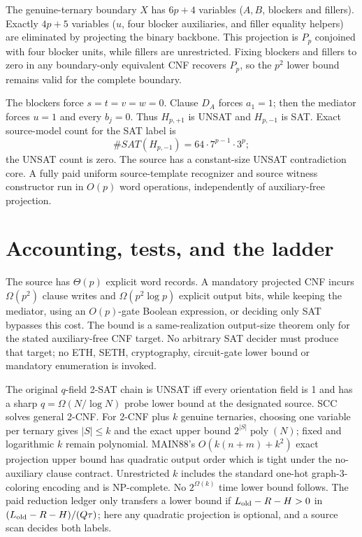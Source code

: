 \documentclass[11pt]{article}
\begin{document}
The genuine-ternary boundary $X$ has $6p+4$ variables ($A,B$, blockers and fillers). Exactly $4p+5$ variables ($u$, four blocker auxiliaries, and filler equality helpers) are eliminated by projecting the binary backbone. This projection is $P_p$ conjoined with four blocker units, while fillers are unrestricted. Fixing blockers and fillers to zero in any boundary-only equivalent CNF recovers $P_p$, so the $p^2$ lower bound remains valid for the complete boundary.

The blockers force $s=t=v=w=0$. Clause $D_A$ forces $a_1=1$; then the mediator forces $u=1$ and every $b_j=0$. Thus $H_{p,+1}$ is UNSAT and $H_{p,-1}$ is SAT. Exact source-model count for the SAT label is
\[
\#SAT(H_{p,-1})=64\cdot7^{p-1}\cdot3^p;
\]
the UNSAT count is zero. The source has a constant-size UNSAT contradiction core. A fully paid uniform source-template recognizer and source witness constructor run in $O(p)$ word operations, independently of auxiliary-free projection.

\section{Accounting, tests, and the ladder}
The source has $\Theta(p)$ explicit word records. A mandatory projected CNF incurs $\Omega(p^2)$ clause writes and $\Omega(p^2\log p)$ explicit output bits, while keeping the mediator, using an $O(p)$-gate Boolean expression, or deciding only SAT bypasses this cost. The bound is a same-realization output-size theorem only for the stated auxiliary-free CNF target. No arbitrary SAT decider must produce that target; no ETH, SETH, cryptography, circuit-gate lower bound or mandatory enumeration is invoked.

The original $q$-field 2-SAT chain is UNSAT iff every orientation field is 1 and has a sharp $q=\Omega(N/\log N)$ probe lower bound at the designated source. SCC solves general 2-CNF. For 2-CNF plus $k$ genuine ternaries, choosing one variable per ternary gives $|S|\le k$ and the exact upper bound $2^{|S|}\operatorname{poly}(N)$; fixed and logarithmic $k$ remain polynomial. MAIN88's $O(k(n+m)+k^2)$ exact projection upper bound has quadratic output order which is tight under the no-auxiliary clause contract. Unrestricted $k$ includes the standard one-hot graph-3-coloring encoding and is NP-complete. No $2^{\Omega(k)}$ time lower bound follows. The paid reduction ledger only transfers a lower bound if $L_{\rm old}-R-H>0$ in $(L_{\rm old}-R-H)/(Q\tau)$; here any quadratic projection is optional, and a source scan decides both labels.
\end{document}

